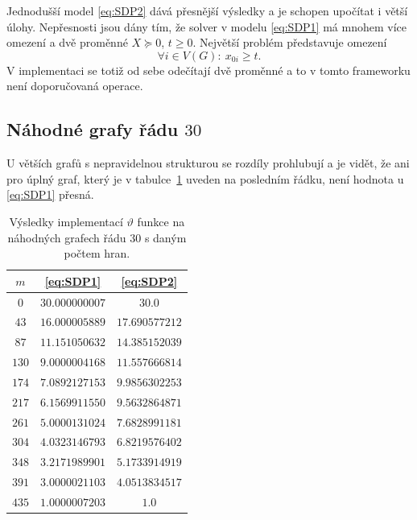 Jednodušší model \ref{eq:SDP2} dává přesnější výsledky a je schopen upočítat i větší úlohy. Nepřesnosti jsou dány tím, že solver v modelu \ref{eq:SDP1} má mnohem více omezení a dvě proměnné $X \succeq 0$, $t \geq 0$. Největší problém představuje omezení
$$
    \forall i \in V(G):\ x_{0i} \geq t.
$$
V implementaci se totiž od sebe odečítají dvě proměnné a to v tomto frameworku není doporučovaná operace.
 

\subsection{Náhodné grafy řádu $30$}

U větších grafů s nepravidelnou strukturou se rozdíly prohlubují a je vidět, že ani pro úplný graf, který je v tabulce~\ref{tab:random_theta} uveden na posledním řádku, není hodnota u \ref{eq:SDP1} přesná.

\begin{table}[h!]
    \begin{center}
        \begin{tabular}{ c | c c }
        $m$    & \ref{eq:SDP1}  &  \ref{eq:SDP2}  \\
        \hline
        $0$    & $30.000000007$ &  $30.0$         \\
        $43$   & $16.000005889$ &  $17.690577212$ \\
        $87$   & $11.151050632$ &  $14.385152039$ \\
        $130$  & $9.0000004168$ &  $11.557666814$ \\
        $174$  & $7.0892127153$ &  $9.9856302253$ \\
        $217$  & $6.1569911550$ &  $9.5632864871$ \\
        $261$  & $5.0000131024$ &  $7.6828991181$ \\
        $304$  & $4.0323146793$ &  $6.8219576402$ \\
        $348$  & $3.2171989901$ &  $5.1733914919$ \\
        $391$  & $3.0000021103$ &  $4.0513834517$ \\
        $435$  & $1.0000007203$ &  $1.0$          \\
        \end{tabular}
    \end{center}
    \caption{Výsledky implementací $\vartheta$ funkce na náhodných grafech řádu $30$ s daným počtem hran.}
    \label{tab:random_theta}
\end{table}
